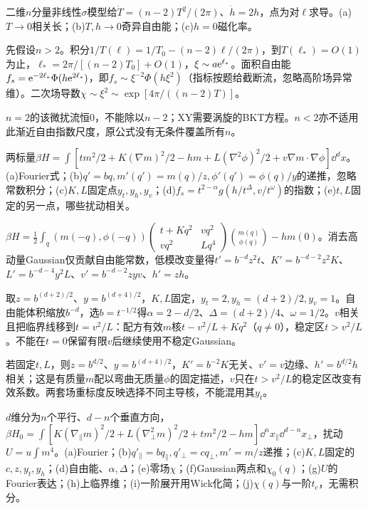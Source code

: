 \begin{exercise}[原题1(a)--(c)]\label{p:334-3-1}
二维$n$分量非线性$\sigma$模型给$\dot T=(n-2)T^2/(2\pi)$、$\dot h=2h$，点为对$\ell$求导。(a)$T\to0$相关长；(b)$T,h\to0$奇异自由能；(c)$h=0$磁化率。
\end{exercise}
\begin{solution}
先假设$n>2$。积分$1/T(\ell)=1/T_0-(n-2)\ell/(2\pi)$，到$T(\ell_*)=O(1)$为止，$\ell_*=2\pi/[(n-2)T_0]+O(1)$，$\xi\sim a\mathrm e^{\ell_*}$。面积自由能$f_s=\mathrm e^{-2\ell_*}\Phi(h\mathrm e^{2\ell_*})$，即$f_s\sim\xi^{-2}\Phi(h\xi^2)$（指标按题给截断流，忽略高阶场异常维）。二次场导数$\chi\sim\xi^2\sim\exp[4\pi/((n-2)T)]$。

$n=2$的该微扰流恒0，不能除以$n-2$；XY需要涡旋的BKT方程。$n<2$亦不适用此渐近自由指数尺度，原公式没有无条件覆盖所有$n$。
\end{solution}
\begin{exercise}[原题2(a)--(e)]\label{p:334-3-2}
两标量$\beta H=\int[tm^2/2+K(\nabla m)^2/2-hm+L(\nabla^2\phi)^2/2+v\nabla m\cdot\nabla\phi]\dd^dx$。(a)Fourier式；(b)$q'=bq,m'(q')=m(q)/z,\phi'(q')=\phi(q)/y$的递推，忽略常数积分；(c)$K,L$固定点$y_t,y_h,y_v$；(d)$f_s=t^{2-\alpha}g(h/t^\Delta,v/t^\omega)$的指数；(e)$t,L$固定的另一点，哪些扰动相关。
\end{exercise}
\begin{solution}
$\beta H=\frac12\int_q(m(-q),\phi(-q))\left(\begin{smallmatrix}t+Kq^2&vq^2\\vq^2&Lq^4\end{smallmatrix}\right)\binom{m(q)}{\phi(q)}-hm(0)$。消去高动量Gaussian仅贡献自由能常数，低模改变量得$t'=b^{-d}z^2t$、$K'=b^{-d-2}z^2K$、$L'=b^{-d-4}y^2L$、$v'=b^{-d-2}zyv$、$h'=zh$。

取$z=b^{(d+2)/2}$、$y=b^{(d+4)/2}$，$K,L$固定，$y_t=2,y_h=(d+2)/2,y_v=1$。自由能体积缩放$b^{-d}$，选$b=t^{-1/2}$得$\alpha=2-d/2$、$\Delta=(d+2)/4$、$\omega=1/2$。$v$相关且把临界线移到$t=v^2/L$：配方有效$m$核$t-v^2/L+Kq^2$（$q\ne0$），稳定区$t>v^2/L$。不能在$t=0$保留有限$v$后继续使用不稳定Gaussian。

若固定$t,L$，则$z=b^{d/2}$、$y=b^{(d+4)/2}$，$K'=b^{-2}K$无关、$v'=v$边缘、$h'=b^{d/2}h$相关；这是有质量$m$配以弯曲无质量$\phi$的固定描述，$v$只在$t>v^2/L$的稳定区改变有效系数。两套场重标度反映选择不同主导核，不能混用其$y_t$。
\end{solution}
\begin{exercise}[原题3(a)--(j)]\label{p:334-3-3}
$d$维分为$n$个平行、$d-n$个垂直方向，$\beta H_0=\int[K(\nabla_\parallel m)^2/2+L(\nabla_\perp^2m)^2/2+tm^2/2-hm]\dd^nx_\parallel\dd^{d-n}x_\perp$，扰动$U=u\int m^4$。(a)Fourier；(b)$q'_\parallel=bq_\parallel,q'_\perp=cq_\perp,m'=m/z$递推；(c)$K,L$固定的$c,z,y_t,y_h$；(d)自由能、$\alpha,\Delta$；(e)零场$\chi$；(f)Gaussian两点和$\chi_0(q)$；(g)$U$的Fourier表达；(h)上临界维；(i)一阶展开用Wick化简；(j)$\chi(q)$与一阶$t_c$，无需积分。
\end{exercise}
